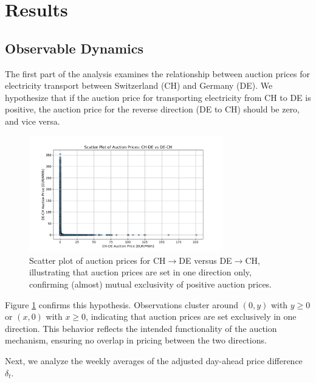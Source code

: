 \documentclass[12pt]{article}
\begin{document}
\section{Results}

\subsection{Observable Dynamics}

The first part of the analysis examines the relationship between auction prices for electricity transport between Switzerland (CH) and Germany (DE). We hypothesize that if the auction price for transporting electricity from CH to DE is positive, the auction price for the reverse direction (DE to CH) should be zero, and vice versa.

\begin{figure}[ht]
    \centering
    \includegraphics[width=0.75\textwidth]{figures/scatter_plot_ch_de_vs_de_ch_auction_prices.png}
    \caption{Scatter plot of auction prices for CH$\rightarrow$DE versus DE$\rightarrow$CH, illustrating that auction prices are set in one direction only, confirming (almost) mutual exclusivity of positive auction prices.}
    \label{fig:scatter_ch_de_auction}
\end{figure}

\noindent
Figure \ref{fig:scatter_ch_de_auction} confirms this hypothesis. Observations cluster around $(0, y)$ with $y \geq 0$ or $(x, 0)$ with $x \geq 0$, indicating that auction prices are set exclusively in one direction. This behavior reflects the intended functionality of the auction mechanism, ensuring no overlap in pricing between the two directions.

Next, we analyze the weekly averages of the adjusted day-ahead price difference $\delta_t$.
\end{document}
